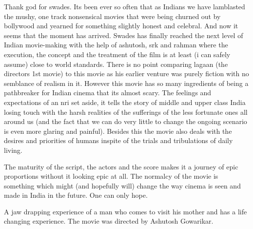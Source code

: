 \documentclass{article}
\begin{document}
Thank god for swades. Its been ever so often that as Indians we have lamblasted the mushy, one track nonsensical movies that were being churned out by bollywood and yearned for something slightly honest and celebral. And now it seems that the moment has arrived. Swades has finally reached the next level of Indian movie-making with the help of ashutosh, srk and rahman where the execution, the concept and the treatment of the film is at least (i can safely assume) close to world standards. There is no point comparing lagaan (the directors 1st movie) to this movie as his earlier venture was purely fiction with no semblance of realism in it. However this movie has so many ingredients of being a pathbreaker for Indian cinema that its almost scary. The feelings and expectations of an nri set aside, it tells the story of middle and upper class India losing touch with the harsh realities of the sufferings of the less fortunate ones all around us (and the fact that we can do very little to change the ongoing scenario is even more glaring and painful). Besides this the movie also deals with the desires and priorities of humans inspite of the trials and tribulations of daily living.

The maturity of the script, the actors and the score makes it a journey of epic proportions without it looking epic at all. The normalcy of the movie is something which might (and hopefully will) change the way cinema is seen and made in India in the future. One can only hope.



A jaw drapping experience of a man who comes to visit his mother and has a life changing experience.
The movie was directed by Ashutosh Gowarikar.
\end{document}
